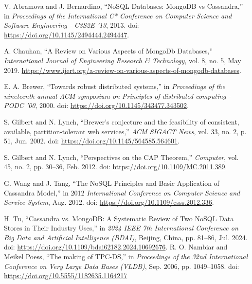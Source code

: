 \documentclass[conference]{IEEEtran}
\begin{document}
\begin{thebibliography}{00}
     V. Abramova and J. Bernardino, ``NoSQL Databases: MongoDB vs Cassandra,'' in \textit{Proceedings of the International C* Conference on Computer Science and Software Engineering - C3S2E ’13}, 2013. doi: \url{https://doi.org/10.1145/2494444.2494447}.

     A. Chauhan, ``A Review on Various Aspects of MongoDb Databases,'' \textit{International Journal of Engineering Research \& Technology}, vol. 8, no. 5, May 2019. \url{https://www.ijert.org/a-review-on-various-aspects-of-mongodb-databases}.

     E. A. Brewer, ``Towards robust distributed systems,'' in \textit{Proceedings of the nineteenth annual ACM symposium on Principles of distributed computing - PODC ’00}, 2000. doi: \url{https://doi.org/10.1145/343477.343502}.

     S. Gilbert and N. Lynch, ``Brewer’s conjecture and the feasibility of consistent, available, partition-tolerant web services,'' \textit{ACM SIGACT News}, vol. 33, no. 2, p. 51, Jun. 2002. doi: \url{https://doi.org/10.1145/564585.564601}.

     S. Gilbert and N. Lynch, ``Perspectives on the CAP Theorem,'' \textit{Computer}, vol. 45, no. 2, pp. 30--36, Feb. 2012. doi: \url{https://doi.org/10.1109/MC.2011.389}.

     G. Wang and J. Tang, ``The NoSQL Principles and Basic Application of Cassandra Model,'' in 2012 \textit{International Conference on Computer Science and Service System}, Aug. 2012. doi: \url{https://doi.org/10.1109/csss.2012.336}.

     H. Tu, ``Cassandra vs. MongoDB: A Systematic Review of Two NoSQL Data Stores in Their Industry Uses,'' in \textit{2024 IEEE 7th International Conference on Big Data and Artificial Intelligence (BDAI)}, Beijing, China, pp. 81--86, Jul. 2024. doi: \url{https://doi.org/10.1109/bdai62182.2024.10692676}.
     R. O. Nambiar and Meikel Poess, ``The making of TPC-DS,''
    in \textit{Proceedings of the 32nd International Conference on Very Large Data Bases (VLDB)}, Sep. 2006, pp. 1049--1058.
    doi: \url{https://doi.org/10.5555/1182635.1164217}
\end{thebibliography}
\end{document}
